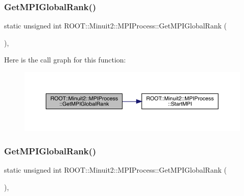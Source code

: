 \subsubsection{\texorpdfstring{GetMPIGlobalRank()}{GetMPIGlobalRank()}\hspace{0.1cm}{\footnotesize\ttfamily [2/3]}}
{\footnotesize\ttfamily static unsigned int R\+O\+O\+T\+::\+Minuit2\+::\+M\+P\+I\+Process\+::\+Get\+M\+P\+I\+Global\+Rank (\begin{DoxyParamCaption}{ }\end{DoxyParamCaption})\hspace{0.3cm}{\ttfamily [inline]}, {\ttfamily [static]}}

Here is the call graph for this function\+:
\nopagebreak
\begin{figure}[H]
\begin{center}
\leavevmode
\includegraphics[width=350pt]{dc/d43/classROOT_1_1Minuit2_1_1MPIProcess_aa7c524a7980698bf9bba3a652e2f9a13_cgraph}
\end{center}
\end{figure}
\mbox{\label{classROOT_1_1Minuit2_1_1MPIProcess_aa7c524a7980698bf9bba3a652e2f9a13}} 
\subsubsection{\texorpdfstring{GetMPIGlobalRank()}{GetMPIGlobalRank()}\hspace{0.1cm}{\footnotesize\ttfamily [3/3]}}
{\footnotesize\ttfamily static unsigned int R\+O\+O\+T\+::\+Minuit2\+::\+M\+P\+I\+Process\+::\+Get\+M\+P\+I\+Global\+Rank (\begin{DoxyParamCaption}{ }\end{DoxyParamCaption})\hspace{0.3cm}{\ttfamily [inline]}, {\ttfamily [static]}}

